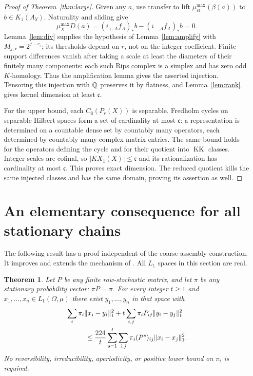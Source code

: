 \documentclass[11pt]{article}
\newtheorem{theorem}{Theorem}
\theoremstyle{remark}\newtheorem{remark}[theorem]{Remark}
\newcommand{\KX}{KX}\newcommand{\KK}{\operatorname{KK}}
\newcommand{\co}{\mathfrak c}\newcommand{\id}{\operatorname{id}}
\begin{document}
\begin{proof}[Proof of Theorem~\ref{thm:large}]
Given any $a$, use transfer to lift $\mu_B^{\max}(\beta(a))$ to
$b\in K_1(A_Y)$. Naturality and sliding give
\[
 \mu_X^{\max}D(a)
 =(i_{+,A}f_A)_*b-(i_{-,A}f_A)_*b=0.
\]
Lemma~\ref{lem:div} supplies the hypothesis of Lemma~\ref{lem:amplify}
with $M_{j,r}=2^{j-c_r}$; its thresholds depend on $r$, not on the integer
coefficient. Finite-support differences vanish after taking a scale at
least the diameters of their finitely many components: each such Rips
complex is a simplex and has zero odd $K$-homology. Thus the amplification
lemma gives the asserted injection. Tensoring this injection with $\mathbb Q$
preserves it by flatness, and Lemma~\ref{lem:rank} gives kernel dimension
at least $\co$.

For the upper bound, each $C_0(P_r(X))$ is separable. Fredholm cycles on
separable Hilbert spaces form a set of cardinality at most $\co$: a
representation is determined on a countable dense set by countably many
operators, each determined by countably many complex matrix entries.
The same bound holds for the operators defining the cycle and for their
quotient into $\KK$ classes. Integer scales are cofinal, so
$|\KX_1(X)|\leq\co$ and its rationalization has cardinality at most $\co$.
This proves exact dimension. The reduced quotient kills the same injected
classes and has the same domain, proving its assertion as well.
\end{proof}

\section{An elementary consequence for all stationary chains}

The following result has a proof independent of the coarse-assembly
construction. It improves and extends the mechanism of \cite{OAImarkov}.
All $L_1$ spaces in this section are real.

\begin{theorem}\label{thm:stationary}
Let $P$ be any finite row-stochastic matrix, and let $\pi$ be any stationary
probability vector: $\pi P=\pi$. For every integer $t\geq1$ and
$x_1,\ldots,x_n\in L_1(\Omega,\mu)$ there exist $y_1,\ldots,y_n$ in that
space with
\begin{align*}
 &\sum_i\pi_i\|x_i-y_i\|_1^2
  +t\sum_{i,j}\pi_iP_{ij}\|y_i-y_j\|_1^2\\
 &\hspace{10mm}\leq\frac{224}{t}\sum_{s=1}^t
      \sum_{i,j}\pi_i(P^s)_{ij}\|x_i-x_j\|_1^2.
\end{align*}
No reversibility, irreducibility, aperiodicity, or positive lower bound on
$\pi_i$ is required.
\end{theorem}
\end{document}
